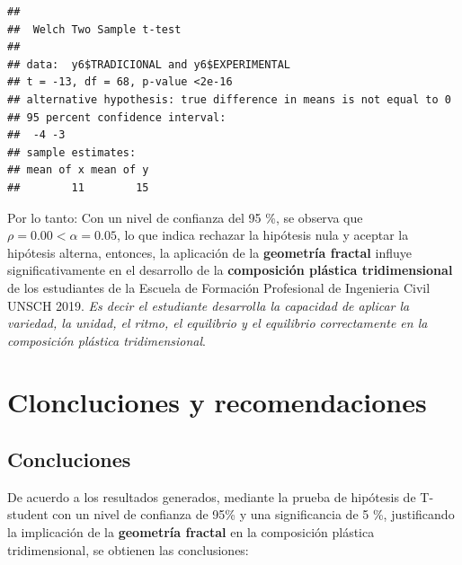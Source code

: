 \documentclass[12pt,]{report}
\begin{document}
\begin{verbatim}
## 
##  Welch Two Sample t-test
## 
## data:  y6$TRADICIONAL and y6$EXPERIMENTAL
## t = -13, df = 68, p-value <2e-16
## alternative hypothesis: true difference in means is not equal to 0
## 95 percent confidence interval:
##  -4 -3
## sample estimates:
## mean of x mean of y 
##        11        15
\end{verbatim}

Por lo tanto: Con un nivel de confianza del 95 \%, se observa que \(\rho=0.00<\alpha=0.05\), lo que indica
rechazar la hipótesis nula y aceptar la hipótesis alterna, entonces, la aplicación de la
\textbf{geometría fractal} influye significativamente en el desarrollo de la \textbf{composición plástica
tridimensional} de los estudiantes de la Escuela de Formación Profesional de Ingenieria
Civil UNSCH 2019. \emph{Es decir el estudiante desarrolla la capacidad de aplicar la variedad,
la unidad, el ritmo, el equilibrio y el equilibrio correctamente en la composición
plástica tridimensional}.

\hypertarget{cloncluciones-y-recomendaciones}{%
\chapter{Cloncluciones y recomendaciones}\label{cloncluciones-y-recomendaciones}}

\hypertarget{concluciones}{%
\section{Concluciones}\label{concluciones}}

De acuerdo a los resultados generados, mediante la prueba de hipótesis de T-student con
un nivel de confianza de 95\% y una significancia de 5 \%, justificando la implicación de la
\textbf{geometría fractal} en la composición plástica tridimensional, se obtienen las conclusiones:
\end{document}
